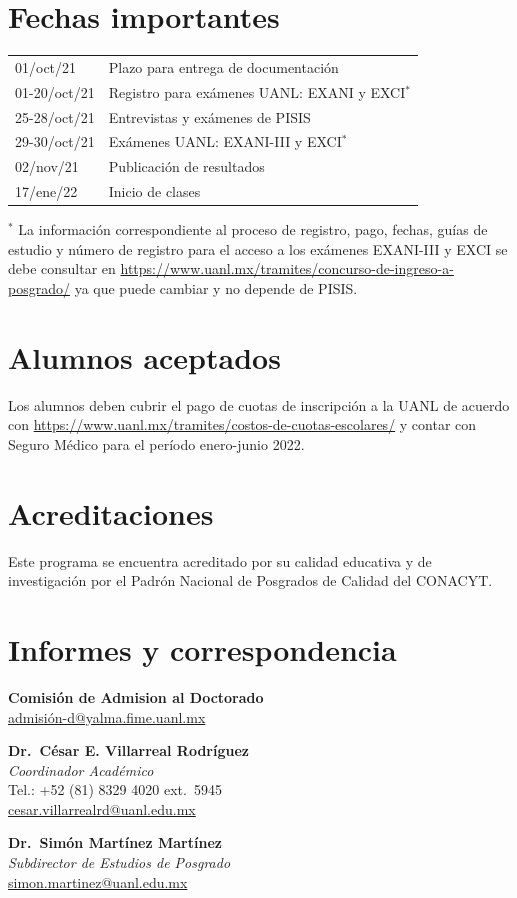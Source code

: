 \documentclass[a0]{sciposter}
\begin{document}
\begin{multicols}{2}
\section*{Fechas importantes}

\begin{tabular}{ll}
01/oct/21 &  Plazo para entrega de documentación \\
01-20/oct/21 & Registro para exámenes UANL: EXANI y EXCI$^*$ \\
25-28/oct/21 & Entrevistas y exámenes de PISIS \\
29-30/oct/21 & Exámenes UANL: EXANI-III y EXCI$^*$ \\
02/nov/21 & Publicación de resultados \\
17/ene/22 & Inicio de clases
\end{tabular}

$^*$ La información correspondiente al proceso de registro, pago,
fechas, guías de estudio y número de registro para el acceso a los
exámenes EXANI-III y EXCI se debe consultar en
\url{https://www.uanl.mx/tramites/concurso-de-ingreso-a-posgrado/} ya
que puede cambiar y no depende de PISIS.

\section*{Alumnos aceptados}

Los alumnos deben cubrir el pago de cuotas de inscripción a la UANL de
acuerdo con
\url{https://www.uanl.mx/tramites/costos-de-cuotas-escolares/} y
contar con Seguro Médico para el período enero-junio 2022.

\section*{Acreditaciones}

Este programa se encuentra acreditado por su calidad educativa y de
investigación por el Padrón Nacional de Posgrados de Calidad del
CONACYT.

\section*{Informes y correspondencia}

{\bf Comisión de Admision al Doctorado}\\
\href{mailto:admisión-d@yalma.fime.uanl.mx}{admisión-d@yalma.fime.uanl.mx}

\quad

{\bf Dr.\ César E. Villarreal Rodríguez} \\
{\em Coordinador Académico} \\
Tel.: +52 (81) 8329 4020 ext.\ 5945 \\
\href{mailto:cesar.villarrealrd@uanl.edu.mx}{cesar.villarrealrd@uanl.edu.mx }

\quad

{\bf Dr.\ Simón Martínez Martínez} \\
{\em Subdirector de Estudios de Posgrado} \\
\href{mailto:simon.martinez@uanl.edu.mx}{simon.martinez@uanl.edu.mx}

\end{multicols}
\end{document}
